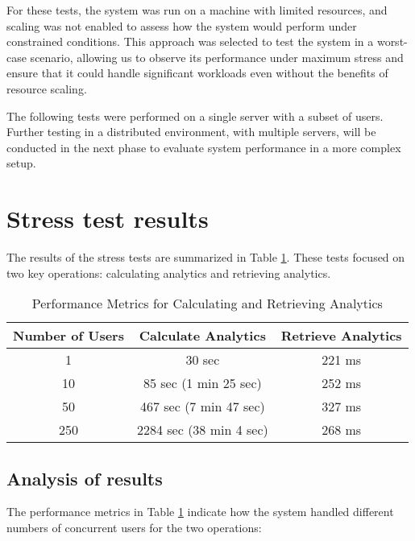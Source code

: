 For these tests, the system was run on a machine with limited resources, and scaling was not enabled to assess how the system would perform under constrained conditions. This approach was selected to test the system in a worst-case scenario, allowing us to observe its performance under maximum stress and ensure that it could handle significant workloads even without the benefits of resource scaling.

The following tests were performed on a single server with a subset of users. Further testing in a distributed environment, with multiple servers, will be conducted in the next phase to evaluate system performance in a more complex setup.

\section{Stress test results}
The results of the stress tests are summarized in Table \ref{table:performance_metrics}. These tests focused on two key operations: calculating analytics and retrieving analytics.

\begin{table}[htbp]
\centering
\begin{tabular}{|c|c|c|}
\hline
\textbf{Number of Users} & \textbf{Calculate Analytics} & \textbf{Retrieve Analytics} \\
\hline
1   & 30 sec              & 221 ms          \\
\hline
10  & 85 sec (1 min 25 sec)& 252 ms          \\
\hline
50  & 467 sec (7 min 47 sec)& 327 ms          \\
\hline
250 & 2284 sec (38 min 4 sec)& 268 ms          \\
\hline
\end{tabular}
\caption{Performance Metrics for Calculating and Retrieving Analytics}
\label{table:performance_metrics}
\end{table}

\subsection{Analysis of results}
The performance metrics in Table \ref{table:performance_metrics} indicate how the system handled different numbers of concurrent users for the two operations:

